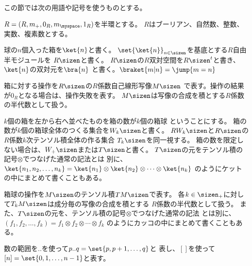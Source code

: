 	この節では次の用語や記号を使うものとする。
	\begin{description}\setlength{\itemsep}{-1mm} %
		\item[係数] $R=(R,m_+,0_R,m_\myspace,1_R)$を半環とする。
		$R$はブーリアン、自然数、整数、実数、複素数とする。
		\item[箱] 球の$n$個入った箱を$\ket{n}$と書く。
		$\set{\ket{n}}_{n\in\sizen}$を基底とする$R$自由半モジュールを
		$R\sizen$と書く。
		$R\sizen$の$R$双対空間を$R\sizen^t$と書き、$\ket{n}$の双対元を$\bra{n}$
		と書く。$\braket{m|n}=\jump{m=n}$
		\item[箱の操作] 箱に対する操作を$R\sizen$の$R$係数自己線形写像$M\sizen$
		で表す。操作の結果が$0_R$となる場合は、操作失敗を表す。
		$M\sizen$は写像の合成を積とする$R$係数の半代数として扱う。
		\item[箱球] $k$個の箱を左から右へ並べたものを箱の数が$k$個の箱球
		ということにする。
		箱の数が$k$個の箱球全体のつくる集合を$W_k\sizen$と書く。
		$RW_k\sizen$と$R\sizen$の$R$係数$k$次テンソル積全体の作る集合
		$T_k\sizen$を同一視する。
		箱の数を限定しない場合は、$W_+\sizen$または$T\sizen$と書く。
		$T\sizen$の元をテンソル積の記号$\otimes$でつなげた通常の記法とは
		別に、$\ket{n_1,n_2,\dots,n_k}
		=\ket{n_1}\otimes\ket{n_2}\otimes\cdots\otimes\ket{n_k}$
		のようにケットの中にまとめて書くこともある。
		\item[箱球の操作] 箱球の操作を$M\sizen$のテンソル積$TM\sizen$で表す。
		各$k\in\sizen_+$に対して$T_kM\sizen$は成分毎の写像の合成を積とする
		$R$係数の半代数として扱う。
		また、$T\sizen$の元を、テンソル積の記号$\otimes$でつなげた通常の記法
		とは別に、$(f_1,f_2,\dots,f_k)
		=f_1\otimes f_2\otimes\cdots\otimes f_k$
		のようにカッコの中にまとめて書くこともある。
		\item[数の集合] 数の範囲を$..$を使って$p..q=\set{p,p+1,\dots,q}$と
		表し、$[]$を使って$[n]=\set{0,1,\dots,n-1}$と表す。
	\end{description} %

